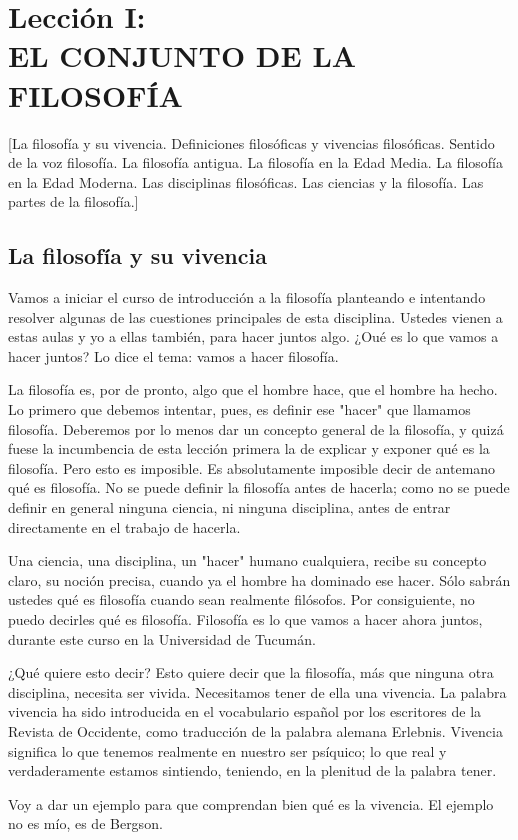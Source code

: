 \documentclass[10pt,letterpaper]{book}
\author{Manuel Garc\'{i}a Morente}
\begin{document}
\chapter*{Lecci\'{o}n I:\\EL CONJUNTO DE LA FILOSOF\'{I}A}
[La filosofía y su vivencia. Definiciones filosóficas y vivencias filosóficas. Sentido de la voz filosofía. La filosofía antigua. La filosofía en la Edad Media. La filosofía en la Edad Moderna. Las disciplinas filosóficas. Las ciencias y la filosofía. Las partes de la filosofía.]
\section*{La filosofía y su vivencia}
Vamos a iniciar el curso de introducción a la filosofía planteando e intentando resolver algunas de las cuestiones principales de esta disciplina. Ustedes vienen a estas aulas y yo a ellas también, para hacer juntos algo. ¿Oué es lo que vamos a hacer juntos? Lo dice el tema: vamos a hacer filosofía.

La filosofía es, por de pronto, algo que el hombre hace, que el hombre ha hecho. Lo primero que debemos intentar, pues, es definir ese "hacer" que llamamos filosofía. Deberemos por lo menos dar un concepto general de la filosofía, y quizá fuese la incumbencia de esta lección primera la de explicar y exponer qué es la filosofía. Pero esto es imposible. Es absolutamente imposible decir de antemano qué es filosofía. No se
puede definir la filosofía antes de hacerla; como no se puede definir en general ninguna ciencia, ni ninguna disciplina, antes de entrar directamente en el trabajo de hacerla.

Una ciencia, una disciplina, un "hacer" humano cualquiera, recibe su concepto claro, su noción precisa, cuando ya el hombre ha dominado ese hacer. Sólo sabrán ustedes qué es filosofía cuando sean realmente filósofos. Por consiguiente, no puedo decirles qué es filosofía. Filosofía es lo que vamos a hacer ahora juntos, durante este curso en la Universidad de Tucumán.

¿Qué quiere esto decir? Esto quiere decir que la filosofía, más que ninguna otra disciplina, necesita ser vivida. Necesitamos tener de ella una \guillemotleft vivencia\guillemotright. La palabra vivencia ha sido introducida en el vocabulario español por los escritores de la Revista de Occidente, como traducción de la palabra alemana \guillemotleft Erlebnis\guillemotright. Vivencia significa lo que tenemos realmente en nuestro ser psíquico; lo que real y verdaderamente estamos sintiendo, teniendo, en la plenitud de la palabra \guillemotleft tener\guillemotright.

Voy a dar un ejemplo para que comprendan bien qué es la \guillemotleft vivencia\guillemotright. El ejemplo no es mío, es de Bergson.
\end{document}
